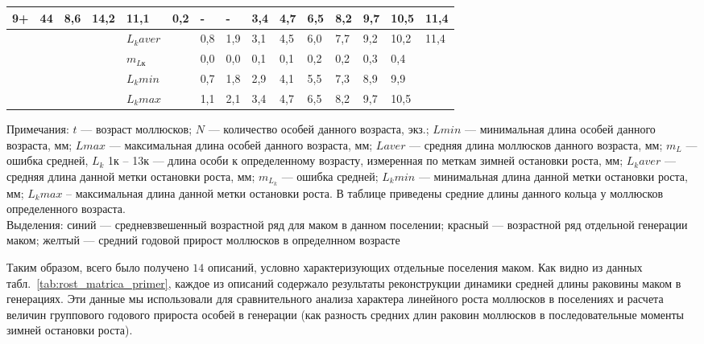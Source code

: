 \begin{table}[p]
\begin{tabularx}{\textwidth}{|X|X|XX|XX|XXXXXXXXX|}
        9+      & 44 & 8,6   & 14,2  & 11,1    & 0,2     & -   & -   & 3,4 & 4,7 & 6,5 & 8,2 & 9,7 & 10,5 & 11,4 \\ \hline
                &    &       &       & $L_{k} aver$  &  & \cellcolor{blue}0,8 & \cellcolor{blue}1,9 & \cellcolor{blue}3,1 & \cellcolor{blue}4,5 & \cellcolor{blue}6,0 & \cellcolor{blue}7,7 & \cellcolor{blue}9,2 & \cellcolor{blue}10,2 & \cellcolor{blue}11,4 \\
                &    &       &       & $m_{Lк}$      &  & 0,0 & 0,0 & 0,1 & 0,1 & 0,2 & 0,2 & 0,3 & 0,4  &      \\
                &    &       &       & $L_{k} min$  &   & 0,7 & 1,8 & 2,9 & 4,1 & 5,5 & 7,3 & 8,9 & 9,9  &      \\
                &    &       &       &  $L_{k} max$ &   & 1,1 & 2,1 & 3,4 & 4,7 & 6,5 & 8,2 & 9,7 & 10,5 &     \\ \hline
    \end{tabularx}
    \footnotesize{Примечания: $t$ --- возраст моллюсков; 
        $N$ --- количество  особей  данного возраста, экз.; 
        $L min$  ---  минимальная   длина  особей   данного   возраста,   мм;   
        $L max$   ---   максимальная   длина   особей   данного   возраста,   мм; 
        $L aver$ --- средняя длина моллюсков данного возраста, мм; 
        $m_L$ --- ошибка средней, 
        $L_k$ 1к -- 13к --- длина особи к определенному возрасту, измеренная по меткам зимней остановки роста, мм;
        $L_k aver$ --- средняя длина данной метки остановки роста, мм; 
        $m_{L_k}$ --- ошибка средней; 
        $L_k min$ --- минимальная длина данной метки остановки роста, мм; 
        $L_k   max$   --   максимальная   длина   данной   метки   остановки   роста.   
        В   таблице   приведены средние длины данного кольца у моллюсков определенного возраста. \\[1em]
    Выделения: синий --- средневзвешенный возрастной ряд для маком в данном поселении;
        красный --- возрастной ряд отдельной генерации маком;
        желтый --- средний годовой прирост моллюсков в определнном возрасте}
\end{table}
Таким образом, всего было получено $14$ описаний, условно характеризующих отдельные поселения маком. 
Как видно из данных табл.~\ref{tab:rost_matrica_primer}, каждое из описаний содержало результаты реконструкции динамики средней длины раковины маком в генерациях. 
Эти данные мы использовали для сравнительного анализа характера линейного роста моллюсков в поселениях и расчета величин группового годового прироста особей в генерации (как разность средних длин раковин моллюсков в последовательные моменты зимней остановки роста).

